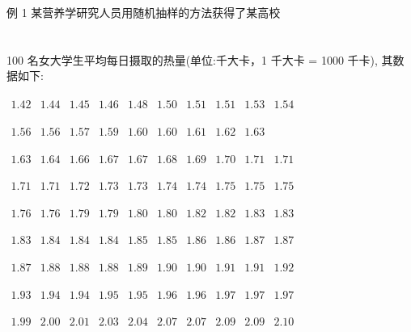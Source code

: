 \documentclass[10pt]{article}
\begin{document}
例 1 某营养学研究人员用随机抽样的方法获得了某高校



\section*{}

100 名女大学生平均每日摄取的热量(单位:千大卡，1 千大卡 = 1000 千卡), 其数据如下:

\(\begin{array}{llllllllll} {1.42} & {1.44} & {1.45} & {1.46} & {1.48} & {1.50} & {1.51} & {1.51} & {1.53} & {1.54} \end{array}\)

\(\begin{array}{lllllllll} {1.56} & {1.56} & {1.57} & {1.59} & {1.60} & {1.60} & {1.61} & {1.62} & {1.63} \end{array}\)

\(\begin{array}{llllllllll} {1.63} & {1.64} & {1.66} & {1.67} & {1.67} & {1.68} & {1.69} & {1.70} & {1.71} & {1.71} \end{array}\)

\(\begin{array}{llllllllll} {1.71} & {1.71} & {1.72} & {1.73} & {1.73} & {1.74} & {1.74} & {1.75} & {1.75} & {1.75} \end{array}\)

\(\begin{array}{llllllllll} {1.76} & {1.76} & {1.79} & {1.79} & {1.80} & {1.80} & {1.82} & {1.82} & {1.83} & {1.83} \end{array}\)

\(\begin{array}{llllllllll} {1.83} & {1.84} & {1.84} & {1.84} & {1.85} & {1.85} & {1.86} & {1.86} & {1.87} & {1.87} \end{array}\)

\(\begin{array}{llllllllll} {1.87} & {1.88} & {1.88} & {1.88} & {1.89} & {1.90} & {1.90} & {1.91} & {1.91} & {1.92} \end{array}\)

\(\begin{array}{llllllllll} {1.93} & {1.94} & {1.94} & {1.95} & {1.95} & {1.96} & {1.96} & {1.97} & {1.97} & {1.97} \end{array}\)

\(\begin{array}{llllllllll} {1.99} & {2.00} & {2.01} & {2.03} & {2.04} & {2.07} & {2.07} & {2.09} & {2.09} & {2.10} \end{array}\)
\end{document}
